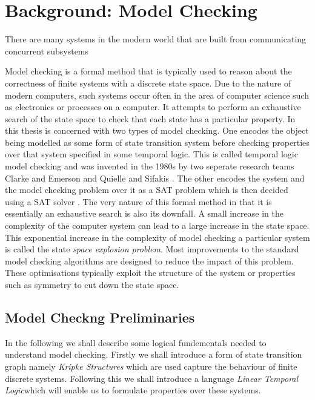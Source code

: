 \chapter{Background: Model Checking}


There are many systems in the modern world that are built from communicating concurrent subsystems 

Model checking is a formal method that is typically used to reason about the correctness of finite systems with a discrete state space. Due to the nature of modern computers, such systems occur often in the area of computer science such as electronics or processes on a computer. It attempts to perform an exhaustive search of the state space to check that each state has a particular property. In this thesis is concerned with two types of model checking. One encodes the object being modelled as some form of state transition system before checking properties over that system specified in some temporal logic. This is called temporal logic model checking and was invented in the 1980s by two seperate research teams  Clarke and Emerson \cite{EM82} and Quielle and Sifakis \cite{JQ82}. The other encodes the system and the model checking problem over it as a SAT problem which is then decided using a SAT solver \cite{MS00}. The very nature of this formal method in that it is essentially an exhaustive search is also its downfall. A small increase in the complexity of the computer system can lead to a large increase in the state space. This exponential increase in the complexity of model checking a particular system is called the state \emph{space explosion problem}. Most improvements to the standard model checking algorithms are designed to reduce the impact of this problem. These optimisations typically exploit the structure of the system or properties such as symmetry to cut down the state space.

\section{Model Checkng Preliminaries}
In the following we shall describe some logical fundementals needed to understand model checking. Firstly we shall introduce a form of state transition graph namely \emph{Kripke Structures} which are used capture the behaviour of finite discrete systems. Following this we shall introduce a language \emph{Linear Temporal Logic}which will enable us to formulate properties over these systems.

